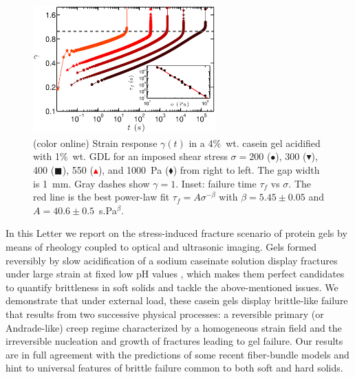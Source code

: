 \documentclass[twocolumn,superscriptaddress,showpacs,preprintnumbers,amsmath,amssymb,prl]{revtex4}
\begin{document}
\begin{figure}
\centering
\includegraphics[width=7cm]{Fig1.eps}
\caption{(color online) Strain response $\gamma(t)$ in a 4\%~wt. casein gel acidified with 1\%~wt. GDL for an imposed shear stress $\sigma=200$ (\textcolor{red!25!black}{$\bullet$}), 300 (\textcolor{red!50!black}{$\blacktriangledown$}), 400 (\textcolor{red!75!black}{$\blacksquare$}), 550 (\textcolor{red}{$\blacktriangle$}), and 1000~Pa (\textcolor{orange!50!red}{$\blacklozenge$}) from right to left. The gap width is 1~mm. Gray dashes show $\gamma=1$. Inset: failure time $\tau_f$ vs $\sigma$. The red line is the best power-law fit $\tau_f=A\sigma^{-\beta}$ with $\beta=5.45\pm 0.05$ and $A=40.6\pm 0.5$~s.Pa$^\beta$.
\label{fig1}}
\end{figure} 

In this Letter we report on the stress-induced fracture scenario of protein gels by means of rheology coupled to optical and ultrasonic imaging. Gels formed reversibly by slow acidification of a sodium caseinate solution \cite{Lucey:1998} display fractures under large strain at fixed low pH values \cite{vanVliet:1995}, which makes them perfect candidates to quantify brittleness in soft solids and tackle the above-mentioned issues. We demonstrate that under external load, these casein gels display brittle-like failure that results from two successive physical processes: a reversible primary (or Andrade-like) creep regime characterized by a homogeneous strain field and the irreversible nucleation and growth of fractures leading to gel failure. Our results are in full agreement with the predictions of some recent fiber-bundle models and hint to universal features of brittle failure common to both soft and hard solids.
\end{document}
